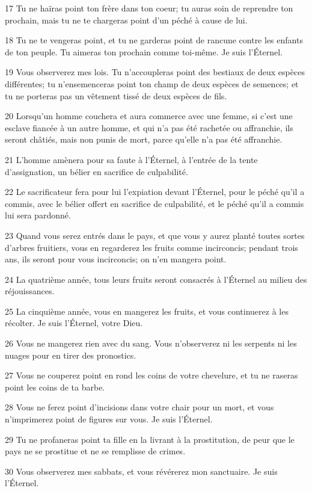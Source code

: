 \par 17 Tu ne haïras point ton frère dans ton coeur; tu auras soin de reprendre ton prochain, mais tu ne te chargeras point d'un péché à cause de lui.
\par 18 Tu ne te vengeras point, et tu ne garderas point de rancune contre les enfants de ton peuple. Tu aimeras ton prochain comme toi-même. Je suis l'Éternel.
\par 19 Vous observerez mes lois. Tu n'accoupleras point des bestiaux de deux espèces différentes; tu n'ensemenceras point ton champ de deux espèces de semences; et tu ne porteras pas un vêtement tissé de deux espèces de fils.
\par 20 Lorsqu'un homme couchera et aura commerce avec une femme, si c'est une esclave fiancée à un autre homme, et qui n'a pas été rachetée ou affranchie, ils seront châtiés, mais non punis de mort, parce qu'elle n'a pas été affranchie.
\par 21 L'homme amènera pour sa faute à l'Éternel, à l'entrée de la tente d'assignation, un bélier en sacrifice de culpabilité.
\par 22 Le sacrificateur fera pour lui l'expiation devant l'Éternel, pour le péché qu'il a commis, avec le bélier offert en sacrifice de culpabilité, et le péché qu'il a commis lui sera pardonné.
\par 23 Quand vous serez entrés dans le pays, et que vous y aurez planté toutes sortes d'arbres fruitiers, vous en regarderez les fruits comme incirconcis; pendant trois ans, ils seront pour vous incirconcis; on n'en mangera point.
\par 24 La quatrième année, tous leurs fruits seront consacrés à l'Éternel au milieu des réjouissances.
\par 25 La cinquième année, vous en mangerez les fruits, et vous continuerez à les récolter. Je suis l'Éternel, votre Dieu.
\par 26 Vous ne mangerez rien avec du sang. Vous n'observerez ni les serpents ni les nuages pour en tirer des pronostics.
\par 27 Vous ne couperez point en rond les coins de votre chevelure, et tu ne raseras point les coins de ta barbe.
\par 28 Vous ne ferez point d'incisions dans votre chair pour un mort, et vous n'imprimerez point de figures sur vous. Je suis l'Éternel.
\par 29 Tu ne profaneras point ta fille en la livrant à la prostitution, de peur que le pays ne se prostitue et ne se remplisse de crimes.
\par 30 Vous observerez mes sabbats, et vous révérerez mon sanctuaire. Je suis l'Éternel.
